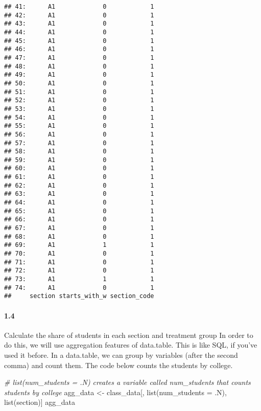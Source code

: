 \documentclass[
]{article}
\newenvironment{Shaded}{\begin{snugshade}}{\end{snugshade}}
\newcommand{\AttributeTok}[1]{\textcolor[rgb]{0.77,0.63,0.00}{#1}}
\newcommand{\CommentTok}[1]{\textcolor[rgb]{0.56,0.35,0.01}{\textit{#1}}}
\newcommand{\FunctionTok}[1]{\textcolor[rgb]{0.00,0.00,0.00}{#1}}
\newcommand{\NormalTok}[1]{#1}
\newcommand{\OtherTok}[1]{\textcolor[rgb]{0.56,0.35,0.01}{#1}}
\begin{document}
\begin{verbatim}
## 41:      A1             0            1
## 42:      A1             0            1
## 43:      A1             0            1
## 44:      A1             0            1
## 45:      A1             0            1
## 46:      A1             0            1
## 47:      A1             0            1
## 48:      A1             0            1
## 49:      A1             0            1
## 50:      A1             0            1
## 51:      A1             0            1
## 52:      A1             0            1
## 53:      A1             0            1
## 54:      A1             0            1
## 55:      A1             0            1
## 56:      A1             0            1
## 57:      A1             0            1
## 58:      A1             0            1
## 59:      A1             0            1
## 60:      A1             0            1
## 61:      A1             0            1
## 62:      A1             0            1
## 63:      A1             0            1
## 64:      A1             0            1
## 65:      A1             0            1
## 66:      A1             0            1
## 67:      A1             0            1
## 68:      A1             0            1
## 69:      A1             1            1
## 70:      A1             0            1
## 71:      A1             0            1
## 72:      A1             0            1
## 73:      A1             1            1
## 74:      A1             0            1
##     section starts_with_w section_code
\end{verbatim}

\hypertarget{section-3}{%
\paragraph{1.4}\label{section-3}}

Calculate the share of students in each section and treatment group In
order to do this, we will use aggregation features of data.table. This
is like SQL, if you've used it before. In a data.table, we can group by
variables (after the second comma) and count them. The code below counts
the students by college.

\begin{Shaded}
\begin{Highlighting}[]
\CommentTok{\# list(num\_students = .N) creates a variable called \textquotesingle{}num\_students\textquotesingle{} that counts students by college}
\NormalTok{agg\_data }\OtherTok{\textless{}{-}}\NormalTok{ class\_data[, }\FunctionTok{list}\NormalTok{(}\AttributeTok{num\_students =}\NormalTok{ .N), }\FunctionTok{list}\NormalTok{(section)]}
\NormalTok{agg\_data}
\end{Highlighting}
\end{Shaded}
\end{document}
